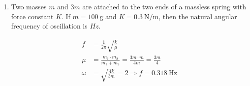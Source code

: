 \begin{enumerate}
\begin{answer}
\begin{align*}
\begin{array}{cc}
		2 k & -k \\
		-k & k
		\end{array}\right)\\
		\left|\begin{array}{cc}
		2 k-\omega^{2} m & -k \\
		-k & k-\omega^{2} m
		\end{array}\right|&=0 \Rightarrow\left(2 k-\omega^{2} m\right)\left(k-\omega^{2} m\right)-k^{2}=0 \Rightarrow \omega=\sqrt{\frac{3+\sqrt{5}}{2}} \sqrt{\frac{k}{m}}
	\end{align*}
THe correct option is \textbf{(c)}
\end{answer}
	\item Two masses $m$ and $3 m$ are attached to the two ends of a massless spring with force constant $K$. If $m=100 \mathrm{~g}$ and $K=0.3 \mathrm{~N} / \mathrm{m}$, then the natural angular frequency of oscillation is $H z$.
	{}

\begin{answer}
	\begin{align*}
	f&=\frac{1}{2 \pi} \sqrt{\frac{k}{\mu}}\\
	\mu&=\frac{m_{1} \cdot m_{2}}{m_{1}+m_{2}}=\frac{3 m \cdot m}{4 m}=\frac{3 m}{4}\\
	\omega&=\sqrt{\frac{4 k}{3 m}}=2 \Rightarrow f=0.318 \mathrm{~Hz}
	\end{align*}
\end{answer}


\end{enumerate}
